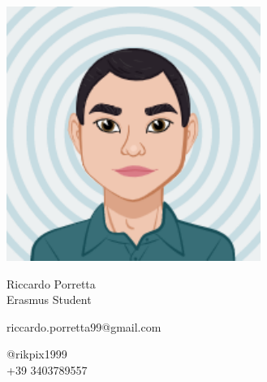 \documentclass{article}
\begin{document}
\centering \includegraphics[width=.25\linewidth]{logo}\\[3pt]
\parbox{2in}{\Large \centering Riccardo Porretta\\[1pt]
\normalsize Erasmus Student}

\vfill
\raggedright
\begin{multicols}{2}
riccardo.porretta99@gmail.com

\columnbreak
\raggedleft
@rikpix1999\\
+39 3403789557%
\end{multicols}%
\end{document}
